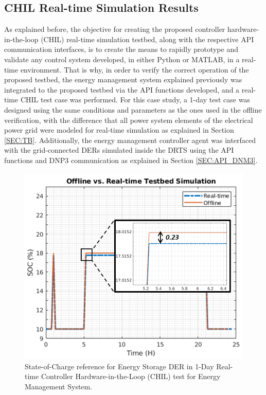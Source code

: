 
\subsection{CHIL Real-time Simulation Results}

As explained before, the objective for creating the proposed controller hardware-in-the-loop (CHIL) real-time simulation testbed, along with the respective API communication interfaces, is to create the means to rapidly prototype and validate any control system developed, in either Python or MATLAB, in a real-time environment. That is why, in order to verify the correct operation of the proposed testbed, the energy management system explained previously was integrated to the proposed testbed via the API functions developed, and a real-time CHIL test case was performed. For this case study, a 1-day test case was designed using the same conditions and parameters as the ones used in the offline verification, with the difference that all power system elements of the electrical power grid were modeled for real-time simulation as explained in Section \ref{SEC:TB}. Additionally,  the energy management controller agent was interfaced with the grid-connected DERs simulated inside the DRTS using the API functions and DNP3 communication as explained in Section \ref{SEC:API_DNM3}. 

\begin{figure}[!ht]
    \centering
    \includegraphics[width = 0.9\linewidth]{figs_juan/realtime_2.png}
    \caption{State-of-Charge reference for Energy Storage DER in 1-Day Real-time Controller Hardware-in-the-Loop (CHIL) test for Energy Management System.}
    \label{fig:realtime}
    \vspace{-1mm}
\end{figure}

